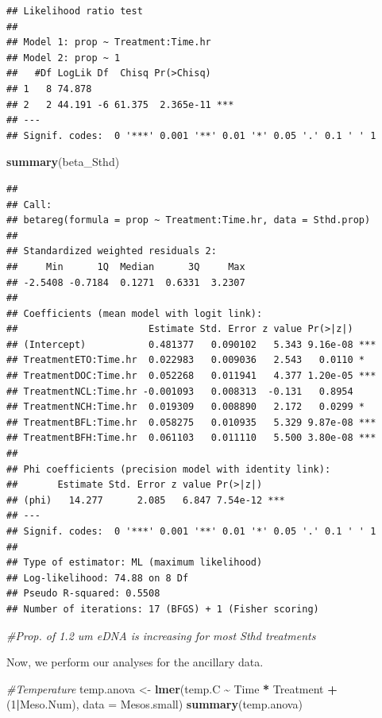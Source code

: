 \documentclass[
]{article}
\newenvironment{Shaded}{\begin{snugshade}}{\end{snugshade}}
\newcommand{\AttributeTok}[1]{\textcolor[rgb]{0.13,0.29,0.53}{#1}}
\newcommand{\CommentTok}[1]{\textcolor[rgb]{0.56,0.35,0.01}{\textit{#1}}}
\newcommand{\DecValTok}[1]{\textcolor[rgb]{0.00,0.00,0.81}{#1}}
\newcommand{\FunctionTok}[1]{\textcolor[rgb]{0.13,0.29,0.53}{\textbf{#1}}}
\newcommand{\NormalTok}[1]{#1}
\newcommand{\OtherTok}[1]{\textcolor[rgb]{0.56,0.35,0.01}{#1}}
\newcommand{\SpecialCharTok}[1]{\textcolor[rgb]{0.81,0.36,0.00}{\textbf{#1}}}
\begin{document}
\begin{verbatim}
## Likelihood ratio test
## 
## Model 1: prop ~ Treatment:Time.hr
## Model 2: prop ~ 1
##   #Df LogLik Df  Chisq Pr(>Chisq)    
## 1   8 74.878                         
## 2   2 44.191 -6 61.375  2.365e-11 ***
## ---
## Signif. codes:  0 '***' 0.001 '**' 0.01 '*' 0.05 '.' 0.1 ' ' 1
\end{verbatim}

\begin{Shaded}
\begin{Highlighting}[]
\FunctionTok{summary}\NormalTok{(beta\_Sthd)}
\end{Highlighting}
\end{Shaded}

\begin{verbatim}
## 
## Call:
## betareg(formula = prop ~ Treatment:Time.hr, data = Sthd.prop)
## 
## Standardized weighted residuals 2:
##     Min      1Q  Median      3Q     Max 
## -2.5408 -0.7184  0.1271  0.6331  3.2307 
## 
## Coefficients (mean model with logit link):
##                       Estimate Std. Error z value Pr(>|z|)    
## (Intercept)           0.481377   0.090102   5.343 9.16e-08 ***
## TreatmentETO:Time.hr  0.022983   0.009036   2.543   0.0110 *  
## TreatmentDOC:Time.hr  0.052268   0.011941   4.377 1.20e-05 ***
## TreatmentNCL:Time.hr -0.001093   0.008313  -0.131   0.8954    
## TreatmentNCH:Time.hr  0.019309   0.008890   2.172   0.0299 *  
## TreatmentBFL:Time.hr  0.058275   0.010935   5.329 9.87e-08 ***
## TreatmentBFH:Time.hr  0.061103   0.011110   5.500 3.80e-08 ***
## 
## Phi coefficients (precision model with identity link):
##       Estimate Std. Error z value Pr(>|z|)    
## (phi)   14.277      2.085   6.847 7.54e-12 ***
## ---
## Signif. codes:  0 '***' 0.001 '**' 0.01 '*' 0.05 '.' 0.1 ' ' 1 
## 
## Type of estimator: ML (maximum likelihood)
## Log-likelihood: 74.88 on 8 Df
## Pseudo R-squared: 0.5508
## Number of iterations: 17 (BFGS) + 1 (Fisher scoring)
\end{verbatim}

\begin{Shaded}
\begin{Highlighting}[]
\CommentTok{\#Prop. of 1.2 um eDNA is increasing for most Sthd treatments}
\end{Highlighting}
\end{Shaded}

Now, we perform our analyses for the ancillary data.

\begin{Shaded}
\begin{Highlighting}[]
\CommentTok{\#Temperature}
\NormalTok{temp.anova }\OtherTok{\textless{}{-}} \FunctionTok{lmer}\NormalTok{(temp.C }\SpecialCharTok{\textasciitilde{}}\NormalTok{ Time }\SpecialCharTok{*}\NormalTok{ Treatment }\SpecialCharTok{+}\NormalTok{ (}\DecValTok{1}\SpecialCharTok{|}\NormalTok{Meso.Num), }\AttributeTok{data =}\NormalTok{ Mesos.small)}
\FunctionTok{summary}\NormalTok{(temp.anova)}
\end{Highlighting}
\end{Shaded}
\end{document}
